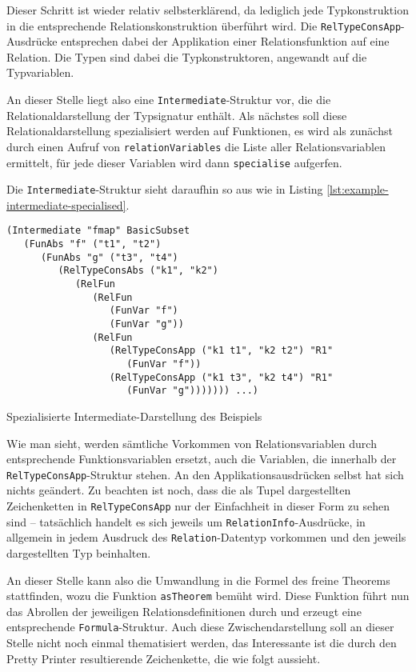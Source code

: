 Dieser Schritt ist wieder relativ selbsterklärend, da lediglich jede Typkonstruktion in die entsprechende Relationskonstruktion
überführt wird. Die \texttt{RelTypeConsApp}-Ausdrücke entsprechen dabei der Applikation einer Relationsfunktion auf
eine Relation. Die Typen sind dabei die Typkonstruktoren, angewandt auf die Typvariablen.

An dieser Stelle liegt also eine \texttt{Intermediate}-Struktur vor, die die Relationaldarstellung der Typsignatur enthält. Als
nächstes soll diese Relationaldarstellung spezialisiert werden auf Funktionen, es wird als zunächst durch einen Aufruf von
\texttt{relationVariables} die Liste aller Relationsvariablen ermittelt, für jede dieser Variablen wird dann \texttt{specialise}
aufgerfen.

Die \texttt{Intermediate}-Struktur sieht daraufhin so aus wie in Listing \ref{lst:example-intermediate-specialised}.

\begin{listing}[ht]
\begin{verbatim}
(Intermediate "fmap" BasicSubset
   (FunAbs "f" ("t1", "t2")
      (FunAbs "g" ("t3", "t4")
         (RelTypeConsAbs ("k1", "k2")
            (RelFun
               (RelFun
                  (FunVar "f")
                  (FunVar "g"))
               (RelFun
                  (RelTypeConsApp ("k1 t1", "k2 t2") "R1"
                     (FunVar "f"))
                  (RelTypeConsApp ("k1 t3", "k2 t4") "R1"
                     (FunVar "g"))))))) ...)
\end{verbatim}
\caption{Spezialisierte Intermediate-Darstellung des Beispiels}
\label{lst:example-intermediate-specialised}
\end{listing}

Wie man sieht, werden sämtliche Vorkommen von Relationsvariablen durch entsprechende Funktionsvariablen ersetzt, auch
die Variablen, die innerhalb der \texttt{RelTypeConsApp}-Struktur stehen. An den Applikationsausdrücken selbst hat sich
nichts geändert. Zu beachten ist noch, dass die als Tupel dargestellten Zeichenketten in \texttt{RelTypeConsApp} nur
der Einfachheit in dieser Form zu sehen sind -- tatsächlich handelt es sich jeweils um \texttt{RelationInfo}-Ausdrücke, in
allgemein in jedem Ausdruck des \texttt{Relation}-Datentyp vorkommen und den jeweils dargestellten Typ beinhalten.

An dieser Stelle kann also die Umwandlung in die Formel des freine Theorems stattfinden, wozu die Funktion \texttt{asTheorem}
bemüht wird. Diese Funktion führt nun das Abrollen der jeweiligen Relationsdefinitionen durch und erzeugt eine
entsprechende \texttt{Formula}-Struktur. Auch diese Zwischendarstellung soll an dieser Stelle nicht noch einmal thematisiert
werden, das Interessante ist die durch den Pretty Printer resultierende Zeichenkette, die wie folgt aussieht.

